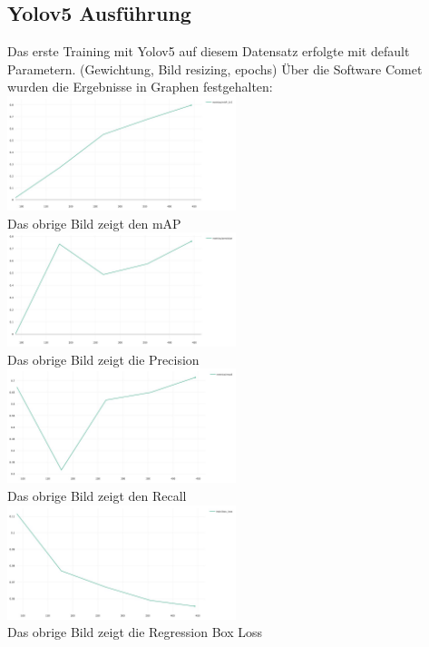 \documentclass[11pt]{scrartcl}
\begin{document}
\subsection{Yolov5 Ausführung}

Das erste Training mit Yolov5 auf diesem Datensatz erfolgte mit default Parametern. (Gewichtung, Bild resizing, epochs)
Über die Software Comet wurden die Ergebnisse in Graphen festgehalten:\\

\includegraphics[width=0.5\textwidth]{mAP}\\ Das obrige Bild zeigt den mAP\\

\includegraphics[width=0.5\textwidth]{precision}\\ Das obrige Bild zeigt die Precision\\

\includegraphics[width=0.5\textwidth]{recall} \\Das obrige Bild zeigt den Recall\\

\includegraphics[width=0.5\textwidth]{box_loss}\\ Das obrige Bild zeigt die Regression Box Loss\\
\end{document}
